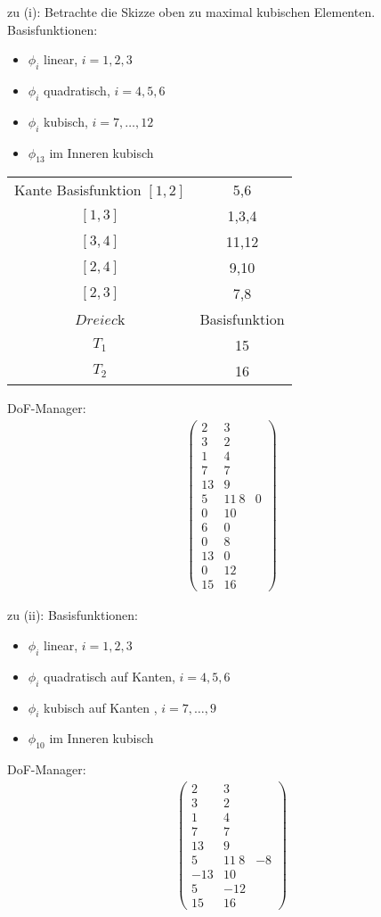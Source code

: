 \begin{beispiel}
  zu (i): Betrachte die Skizze oben zu maximal kubischen Elementen. 
Basisfunktionen:
\begin{itemize}
\item $\phi_i$ linear, $i = 1, 2, 3$
\item $\phi_i$ quadratisch, $i = 4, 5, 6$
\item $\phi_i$ kubisch, $i = 7, \dots, 12$
\item $\phi_{13}$ im Inneren kubisch
\end{itemize}

  \begin{tabular}{c c}
    Kante Basisfunktion
$[1, 2]$& 5,6\\
$[1, 3]$& 1,3,4 \\
$[3, 4]$& 11,12\\
$[2, 4]$&9,10\\
$[2, 3]$&7,8\\
$Dreiec$k & Basisfunktion \\
$T_1$ & 15\\
$T_2$ & 16
  \end{tabular}

DoF-Manager:
\begin{align*}
  \begin{pmatrix}
    2 & 3\\
    3 & 2\\
    1 & 4\\
    7 & 7\\
    13 & 9\\
    5 & 11\
    8 & 0\\
    0 & 10\\
    6 & 0\\
    0 & 8\\
    13& 0\\
    0 &12 \\
    15&16
  \end{pmatrix}
\end{align*}

zu (ii): Basisfunktionen:
\begin{itemize}
\item $\phi_i$ linear, $i = 1, 2, 3$
\item $\phi_i$ quadratisch auf Kanten, $i = 4, 5, 6$
\item $\phi_i$ kubisch auf Kanten , $i = 7, \dots, 9$
\item $\phi_{10}$ im Inneren kubisch
\end{itemize}


DoF-Manager:
\begin{align*}
  \begin{pmatrix}
    2 & 3\\
    3 & 2\\
    1 & 4\\
    7 & 7\\
    13 & 9\\
    5 & 11\
    8 & -8\\
    -13 & 10\\
    5 & -12\\
    15&16
  \end{pmatrix}
\end{align*}
\end{beispiel}
